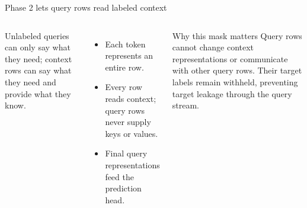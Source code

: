 \documentclass[11pt,aspectratio=169,hyperref={colorlinks}]{beamer}
\newcommand{\visualdescription}[1]{\par\vspace{.2em}\noindent\parbox{\linewidth}{\centering\tiny\color{sourcegray}#1}}
\begin{document}
\begin{frame}{Phase 2 lets query rows read labeled context}
\begin{columns}[c]
\visualdescription{Unlabeled queries can only say what they need; context rows can say what they need and provide what they know.}
\small
\begin{itemize}\itemsep.5em
\item Each token represents an entire row.
\item Every row reads context; query rows never supply keys or values.
\item Final query representations feed the prediction head.
\end{itemize}
\begin{block}{Why this mask matters}
\footnotesize
Query rows cannot change context representations or communicate with other query rows. Their target labels remain withheld, preventing target leakage through the query stream.
\end{block}
\end{columns}
\end{frame}
\end{document}

